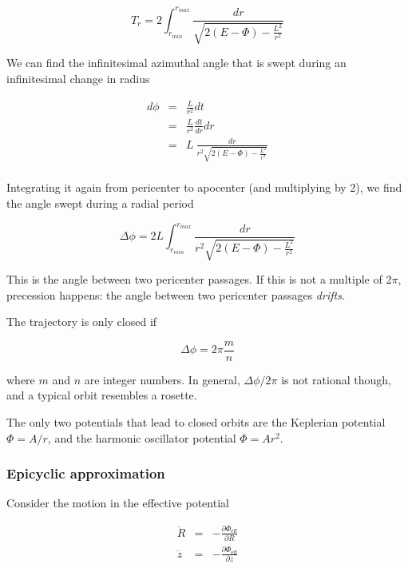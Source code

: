 \begin{equation}
\boxed{T_r =  2 \int_{r_{min}}^{r_{max}} \frac{dr}{\sqrt{2(E-\varPhi) - \frac{L^2}{r^2}}}}
\end{equation}

We can find the infinitesimal azimuthal angle that is swept during an infinitesimal change in radius 

\begin{eqnarray}
d\phi &=& \frac{L}{r^2} dt\\
&=& \frac{L}{r^2} \frac{dt}{dr} dr \\
&=& L \ \frac{dr}{r^2\sqrt{2(E-\varPhi) - \frac{L^2}{r^2}}} \\
\end{eqnarray}

Integrating it again from pericenter to apocenter (and multiplying by 2), we find the angle swept during a radial period

\begin{equation}
\boxed{\Delta \phi  = 2L \int_{r_{min}}^{r_{max}}  \frac{dr}{r^2\sqrt{2(E-\varPhi) - \frac{L^2}{r^2}}}}
\end{equation}

This is the angle between two pericenter passages. If this is not a multiple of 2$\pi$, precession happens: the angle between two pericenter passages {\it drifts}. 


The trajectory is only closed if 

\begin{equation}
\Delta \phi = 2\pi\frac{m}{n}
\end{equation}

where $m$ and $n$ are integer numbers. In general, $\Delta \phi/2\pi$ is not rational though, and a typical orbit resembles a rosette. 

The only two potentials that lead to closed orbits are the Keplerian potential $\varPhi=A/r$, and the harmonic oscillator potential $\varPhi=Ar^2$. 

\subsubsection{Epicyclic approximation}

Consider the motion in the effective potential


\begin{eqnarray}
\ddot{R} &=& -\frac{\partial \varPhi_\mathrm{eff}}{\partial R}\\
\ddot{z} &=& -\frac{\partial \varPhi_\mathrm{eff}}{\partial z}
\end{eqnarray}

